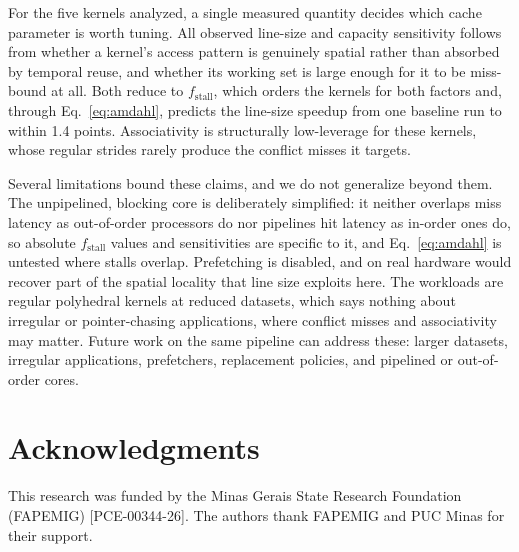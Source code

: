 \documentclass[12pt]{article}
\begin{document}
For the five kernels analyzed, a single measured quantity decides which cache
parameter is worth tuning. All observed line-size and capacity sensitivity
follows from whether a kernel's access pattern is genuinely spatial rather than
absorbed by temporal reuse, and whether its working set is large enough for it
to be miss-bound at all. Both reduce to \(f_{\text{stall}}\), which orders the
kernels for both factors and, through Eq.~\ref{eq:amdahl}, predicts the
line-size speedup from one baseline run to within 1.4 points. Associativity is
structurally low-leverage for these kernels, whose regular strides rarely produce
the conflict misses it targets.

Several limitations bound these claims, and we do not generalize beyond them.
The unpipelined, blocking core is deliberately simplified: it neither overlaps
miss latency as out-of-order processors do nor pipelines hit latency as in-order
ones do, so absolute \(f_{\text{stall}}\) values and sensitivities are specific
to it, and Eq.~\ref{eq:amdahl} is untested where stalls overlap. Prefetching is
disabled, and on real hardware would recover part of the spatial locality that
line size exploits here. The workloads are regular polyhedral kernels at reduced
datasets, which says nothing about irregular or pointer-chasing applications,
where conflict misses and associativity may matter. Future work on the same
pipeline can address these: larger datasets, irregular applications,
prefetchers, replacement policies, and pipelined or out-of-order cores.

\section*{Acknowledgments}
This research was funded by the Minas Gerais State Research Foundation (FAPEMIG)
[PCE-00344-26]. The authors thank FAPEMIG and PUC Minas for their support.



\end{document}
